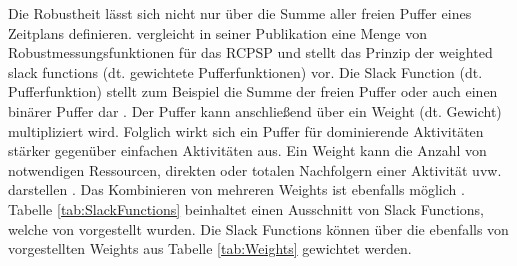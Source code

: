 Die Robustheit lässt sich nicht nur über die Summe aller freien Puffer eines Zeitplans definieren. \cite{khemakhem_efficient_2013} vergleicht in seiner Publikation eine Menge von Robustmessungsfunktionen für das RCPSP und stellt das Prinzip der weighted slack functions (dt. gewichtete Pufferfunktionen) vor. Die Slack Function (dt. Pufferfunktion) stellt zum Beispiel die Summe der freien Puffer oder auch einen binärer Puffer dar \cite[vgl.][S. 253 f.]{khemakhem_efficient_2013}. Der Puffer kann anschließend über ein Weight (dt. Gewicht) multipliziert wird. Folglich wirkt sich ein Puffer für dominierende Aktivitäten stärker gegenüber einfachen Aktivitäten aus. Ein Weight kann die Anzahl von notwendigen Ressourcen, direkten oder totalen Nachfolgern einer Aktivität uvw. darstellen \cite[vgl.][S. 254 ff.]{khemakhem_efficient_2013}. Das Kombinieren von mehreren Weights ist ebenfalls möglich \cite[vgl.][S. 254 ff.]{khemakhem_efficient_2013}. \\

Tabelle \ref{tab:SlackFunctions} beinhaltet einen Ausschnitt von Slack Functions, welche von \cite{khemakhem_efficient_2013} vorgestellt wurden. Die Slack Functions können über die ebenfalls von \cite{khemakhem_efficient_2013} vorgestellten Weights aus Tabelle \ref{tab:Weights} gewichtet werden. \\

\begin{table}[H]
\centering
{}%

\caption{Definitionen von Slack Functions zur Robustheitsmessung}
\label{tab:SlackFunctions}
\end{table}

